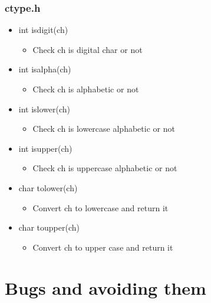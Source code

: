 \documentclass{../c-lecture}
\begin{document}
\begin{frame}
  \frametitle{ctype.h}
  \begin{itemize}
    \item int isdigit(ch)
    \begin{itemize}
      \item Check ch is digital char or not
    \end{itemize}

    \pause

    \item int isalpha(ch)
    \begin{itemize}
      \item Check ch is alphabetic or not
    \end{itemize}

    \pause

    \item int islower(ch)
    \begin{itemize}
      \item Check ch is lowercase alphabetic or not
    \end{itemize}

    \pause

    \item int isupper(ch)
    \begin{itemize}
      \item Check ch is uppercase alphabetic or not
    \end{itemize}

    \pause

    \item char tolower(ch)
    \begin{itemize}
      \item Convert ch to lowercase and return it
    \end{itemize}

    \pause

    \item char toupper(ch)
    \begin{itemize}
      \item Convert ch to upper case and return it
    \end{itemize}
  \end{itemize}
\end{frame}

\section{Bugs and avoiding them}
\end{document}
